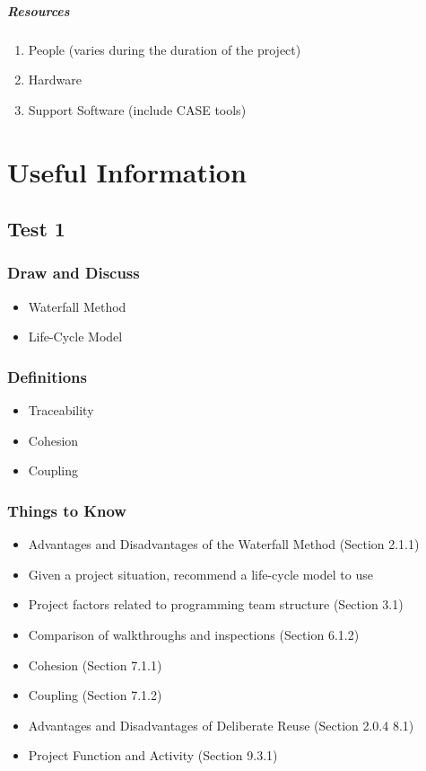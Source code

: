 \documentclass{report}
\begin{document}
				\subsubsection{Resources}
					\begin{enumerate}
						\item People (varies during the duration of the project)
						\item Hardware
						\item Support Software (include CASE tools)
					\end{enumerate}
\part{Useful Information}
	\chapter{Test 1}
		\section{Draw and Discuss}
			\begin{itemize}
				\item Waterfall Method 
				\item Life-Cycle Model
			\end{itemize}
		\section{Definitions}
			\begin{itemize}
				\item Traceability
				\item Cohesion
				\item Coupling
			\end{itemize}
		\section{Things to Know}
			\begin{itemize}
				\item Advantages and Disadvantages of the Waterfall Method (Section 2.1.1)
				\item Given a project situation, recommend a life-cycle model to use
				\item Project factors related to programming team structure (Section 3.1)
				\item Comparison of walkthroughs and inspections (Section 6.1.2)
				\item Cohesion (Section 7.1.1)
				\item Coupling (Section 7.1.2)
				\item Advantages and Disadvantages of Deliberate Reuse (Section 2.0.4 8.1)
				\item Project Function and Activity (Section 9.3.1)
			\end{itemize}
\end{document}
